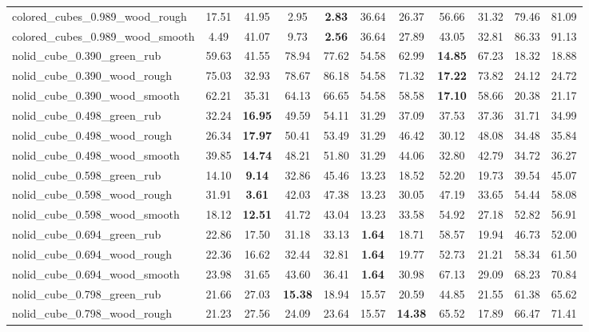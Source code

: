 \begin{table}[H]
{\begin{tabular}{l cccccccccc}
        colored\_cubes\_0.989\_wood\_rough & 17.51 & 41.95 & 2.95 & \textbf{2.83} & 36.64 & 26.37 & 56.66 & 31.32 & 79.46 & 81.09 \\
        colored\_cubes\_0.989\_wood\_smooth & 4.49 & 41.07 & 9.73 & \textbf{2.56} & 36.64 & 27.89 & 43.05 & 32.81 & 86.33 & 91.13 \\
        nolid\_cube\_0.390\_green\_rub & 59.63 & 41.55 & 78.94 & 77.62 & 54.58 & 62.99 & \textbf{14.85} & 67.23 & 18.32 & 18.88 \\
        nolid\_cube\_0.390\_wood\_rough & 75.03 & 32.93 & 78.67 & 86.18 & 54.58 & 71.32 & \textbf{17.22} & 73.82 & 24.12 & 24.72 \\
        nolid\_cube\_0.390\_wood\_smooth & 62.21 & 35.31 & 64.13 & 66.65 & 54.58 & 58.58 & \textbf{17.10} & 58.66 & 20.38 & 21.17 \\
        nolid\_cube\_0.498\_green\_rub & 32.24 & \textbf{16.95} & 49.59 & 54.11 & 31.29 & 37.09 & 37.53 & 37.36 & 31.71 & 34.99 \\
        nolid\_cube\_0.498\_wood\_rough & 26.34 & \textbf{17.97} & 50.41 & 53.49 & 31.29 & 46.42 & 30.12 & 48.08 & 34.48 & 35.84 \\
        nolid\_cube\_0.498\_wood\_smooth & 39.85 & \textbf{14.74} & 48.21 & 51.80 & 31.29 & 44.06 & 32.80 & 42.79 & 34.72 & 36.27 \\
        nolid\_cube\_0.598\_green\_rub & 14.10 & \textbf{9.14} & 32.86 & 45.46 & 13.23 & 18.52 & 52.20 & 19.73 & 39.54 & 45.07 \\
        nolid\_cube\_0.598\_wood\_rough & 31.91 & \textbf{3.61} & 42.03 & 47.38 & 13.23 & 30.05 & 47.19 & 33.65 & 54.44 & 58.08 \\
        nolid\_cube\_0.598\_wood\_smooth & 18.12 & \textbf{12.51} & 41.72 & 43.04 & 13.23 & 33.58 & 54.92 & 27.18 & 52.82 & 56.91 \\
        nolid\_cube\_0.694\_green\_rub & 22.86 & 17.50 & 31.18 & 33.13 & \textbf{1.64} & 18.71 & 58.57 & 19.94 & 46.73 & 52.00 \\
        nolid\_cube\_0.694\_wood\_rough & 22.36 & 16.62 & 32.44 & 32.81 & \textbf{1.64} & 19.77 & 52.73 & 21.21 & 58.34 & 61.50 \\
        nolid\_cube\_0.694\_wood\_smooth & 23.98 & 31.65 & 43.60 & 36.41 & \textbf{1.64} & 30.98 & 67.13 & 29.09 & 68.23 & 70.84 \\
        nolid\_cube\_0.798\_green\_rub & 21.66 & 27.03 & \textbf{15.38} & 18.94 & 15.57 & 20.59 & 44.85 & 21.55 & 61.38 & 65.62 \\
        nolid\_cube\_0.798\_wood\_rough & 21.23 & 27.56 & 24.09 & 23.64 & 15.57 & \textbf{14.38} & 65.52 & 17.89 & 66.47 & 71.41 \\

\end{tabular}}
\end{table}
